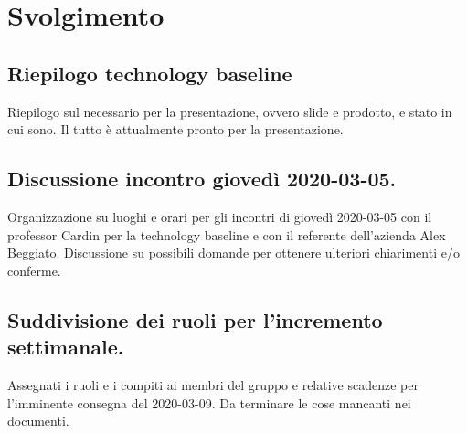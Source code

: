 \newpage
\section*{Svolgimento}

	\subsection*{Riepilogo technology baseline}
		Riepilogo sul necessario per la presentazione, ovvero slide e prodotto, e stato in cui sono.
		\newline
		Il tutto è attualmente pronto per la presentazione.

	\subsection*{Discussione incontro giovedì 2020-03-05.}
		Organizzazione su luoghi e orari per gli incontri di giovedì 2020-03-05 con il professor Cardin per la technology baseline e con il referente dell'azienda Alex Beggiato.
		\newline
		Discussione su possibili domande per ottenere ulteriori chiarimenti e/o conferme.

	\subsection*{Suddivisione dei ruoli per l'incremento settimanale.}
		Assegnati i ruoli e i compiti ai membri del gruppo e relative scadenze per l'imminente consegna del 2020-03-09.
		\newline
		Da terminare le cose mancanti nei documenti.